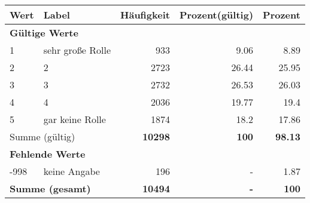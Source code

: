      \begin{longtable}{lXrrr}
     \toprule
     \textbf{Wert} & \textbf{Label} & \textbf{Häufigkeit} & \textbf{Prozent(gültig)} & \textbf{Prozent} \\
     \endhead
     \midrule
     \multicolumn{5}{l}{\textbf{Gültige Werte}}\\

     1 &
     \multicolumn{1}{X}{ sehr große Rolle   } &


       \num{933} &
       \num[round-mode=places,round-precision=2]{9.06} &
         \num[round-mode=places,round-precision=2]{8.89} \\

     2 &
     \multicolumn{1}{X}{ 2   } &


       \num{2723} &
       \num[round-mode=places,round-precision=2]{26.44} &
         \num[round-mode=places,round-precision=2]{25.95} \\

     3 &
     \multicolumn{1}{X}{ 3   } &


       \num{2732} &
       \num[round-mode=places,round-precision=2]{26.53} &
         \num[round-mode=places,round-precision=2]{26.03} \\

     4 &
     \multicolumn{1}{X}{ 4   } &


       \num{2036} &
       \num[round-mode=places,round-precision=2]{19.77} &
         \num[round-mode=places,round-precision=2]{19.4} \\

     5 &
     \multicolumn{1}{X}{ gar keine Rolle   } &


       \num{1874} &
       \num[round-mode=places,round-precision=2]{18.2} &
         \num[round-mode=places,round-precision=2]{17.86} \\
     \midrule
     \multicolumn{2}{l}{Summe (gültig)} &
       \textbf{\num{10298}} &
     \textbf{\num{100}} &
       \textbf{\num[round-mode=places,round-precision=2]{98.13}} \\
     \multicolumn{5}{l}{\textbf{Fehlende Werte}}\\
       -998 &
       keine Angabe &
         \num{196} &
        - &
         \num[round-mode=places,round-precision=2]{1.87} \\
     \midrule
     \multicolumn{2}{l}{\textbf{Summe (gesamt)}} &
          \textbf{\num{10494}} &
        \textbf{-} &
        \textbf{\num{100}} \\
     \bottomrule
     \end{longtable}
     
